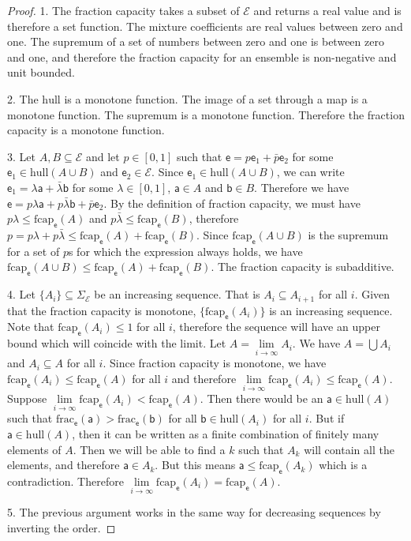 \documentclass[10pt,twocolumn, nofootinbib]{revtex4-2}
\newcommand\hull{\mathrm{hull}}
\newcommand\size{\mathrm{frac}}
\newcommand\fcap{\mathrm{fcap}}
\newcommand{\ens}[1][e] {\mathsf{#1}} %
\newcommand{\Ens}[1][E] {\mathcal{#1}} %
\begin{document}
\begin{proof}
	1. The fraction capacity takes a subset of $\Ens$ and returns a real value and is therefore a set function. The mixture coefficients are real values between zero and one. The supremum of a set of numbers between zero and one is between zero and one, and therefore the fraction capacity for an ensemble is non-negative and unit bounded.
	
	2. The $\hull$ is a monotone function. The image of a set through a map is a monotone function. The supremum is a monotone function. Therefore the fraction capacity is a monotone function.
	
	3. Let $A, B \subseteq \Ens$ and let $p \in [0,1]$ such that $\ens = p \ens_1 + \bar{p} \ens_2$ for some $\ens_1 \in \hull(A \cup B)$ and $\ens_2 \in \Ens$. Since $\ens_1 \in \hull(A \cup B)$, we can write $\ens_1 = \lambda \ens[a] + \bar{\lambda} \ens[b]$ for some $\lambda \in [0,1]$, $\ens[a] \in A$ and $\ens[b] \in B$. Therefore we have $\ens = p \lambda \ens[a] + p \bar{\lambda} \ens[b] + \bar{p} \ens_2$. By the definition of fraction capacity, we must have $p\lambda \leq \fcap_{\ens}(A)$ and $p\bar{\lambda} \leq \fcap_{\ens}(B)$, therefore $p = p\lambda + p\bar{\lambda} \leq \fcap_{\ens}(A) + \fcap_{\ens}(B)$. 	Since $\fcap_{\ens}(A \cup B)$ is the supremum for a set of $p$s for which the expression always holds, we have $\fcap_{\ens}(A \cup B) \leq \fcap_{\ens}(A) + \fcap_{\ens}(B)$. The fraction capacity is subadditive.
	
	4. Let $\{A_i\} \subseteq \Sigma_{\Ens}$ be an increasing sequence. That is $A_i \subseteq A_{i+1}$ for all $i$. Given that the fraction capacity is monotone, $\{\fcap_{\ens}(A_i)\}$ is an increasing sequence. Note that $\fcap_{\ens}(A_i) \leq 1$ for all $i$, therefore the sequence will have an upper bound which will coincide with the limit. Let $A = \lim\limits_{i \to \infty} A_i$. We have $A = \bigcup A_i$ and $A_i \subseteq A$ for all $i$. Since fraction capacity is monotone, we have $\fcap_{\ens}(A_i) \leq \fcap_{\ens}(A)$ for all $i$ and therefore $\lim\limits_{i \to \infty} \fcap_{\ens}(A_i) \leq \fcap_{\ens}(A)$. Suppose $\lim\limits_{i \to \infty} \fcap_{\ens}(A_i) < \fcap_{\ens}(A)$. Then there would be an $\ens[a] \in \hull(A)$ such that $\size_{\ens}(\ens[a]) > \size_{\ens}(\ens[b])$ for all $\ens[b] \in \hull(A_i)$ for all $i$. But if $\ens[a] \in \hull(A)$, then it can be written as a finite combination of finitely many elements of $A$. Then we will be able to find a $k$ such that $A_k$ will contain all the elements, and therefore $\ens[a] \in A_k$. But this means $\ens[a] \leq \fcap_{\ens}(A_k)$ which is a contradiction. Therefore $\lim\limits_{i \to \infty} \fcap_{\ens}(A_i) = \fcap_{\ens}(A)$.
	
	5. The previous argument works in the same way for decreasing sequences by inverting the order.
\end{proof}
\end{document}
